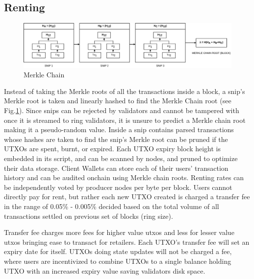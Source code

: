 \documentclass[a4paper,10pt]{article}
\begin{document}
\subsection{Renting}
\begin{figure}[H]
\begin{center}
\includegraphics[width=13cm]{merklechain}
\caption{Merkle Chain}
\label{chain}
\end{center}
\end{figure}
Instead of taking the Merkle roots of all the transactions inside a block, a snip's Merkle root is taken and linearly hashed to find the Merkle Chain root (see Fig.\ref{chain}). Since snips can be rejected by validators and cannot be tampered with once it is streamed to ring validators, it is unsure to predict a Merkle chain root making it a pseudo-random value. Inside a snip contains parsed transactions whose hashes are taken to find the snip's Merkle root can be pruned if the UTXOs are spent, burnt, or expired. Each UTXO expiry block height is embedded in its script, and can be scanned by nodes, and pruned to optimize their data storage. Client Wallets can store each of their users' transaction history and can be audited onchain using Merkle chain roots. Renting rates can be independently voted by producer nodes per byte per block. Users cannot directly pay for rent, but rather each new UTXO created is charged a transfer fee in the range of 0.05\% - 0.005\% decided based on the total volume of all transactions settled on previous set of blocks (ring size).


 Transfer fee charges more fees for higher value utxos and less for lesser value utxos bringing ease to transact for retailers. Each UTXO's transfer fee will set an expiry date for itself. UTXOs doing state updates \cite{stateupdate} will not be charged a fee, where users are incentivized to combine UTXOs to a single balance holding UTXO with an increased expiry value saving validators disk space. 
\end{document}
